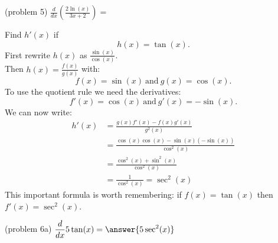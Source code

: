 \documentclass{ximera}
\begin{document}
\begin{center}
\begin{foldable}
\end{foldable}
\end{center}



\begin{problem}(problem 5)
  $\displaystyle{\frac{d}{dx} \left(\frac{2\ln(x)}{3x + 2}\right)=}$\\
  
  \begin{multipleChoice}
  \end{multipleChoice}
\end{problem}




\begin{example}[example 6]
Find $h'(x)$ if
\[
h(x) = \tan(x).
\]
First rewrite $h(x)$ as 
$\displaystyle{\frac{\sin(x)}{\cos(x)}}.$ \\
Then $\displaystyle{h(x) = \frac{f(x)}{g(x)}}$ with:
\[f(x) = \sin(x) \ \mbox{and} \  g(x)= \cos(x).\] 
To use the quotient rule we need the derivatives:
\[f'(x) = \cos(x) \ \mbox{and} \  g'(x) = -\sin(x).\]
We can now write: 
\begin{align*}
h'(x) &= \frac{g(x)f'(x) - f(x)g'(x)}{g^2(x)}\\
&= \frac{\cos(x)\cos(x) - \sin(x)(-\sin(x))}{\cos^2(x)}\\
&= \frac{\cos^2(x)+ \sin^2(x)}{\cos^2(x)}\\
&= \frac{1}{\cos^2(x)} = \sec^2(x)
\end{align*}
This important formula is worth remembering: if $f(x) = \tan(x)$ then $f'(x) =\sec^2(x)$.
\end{example}



\begin{center}
\begin{foldable}
\end{foldable}
\end{center}

\begin{problem}(problem 6a)
  $\displaystyle{\frac{d}{dx} 5\tan(x)= \answer{5\sec^2(x)}}$\\
\end{problem}
\end{document}
